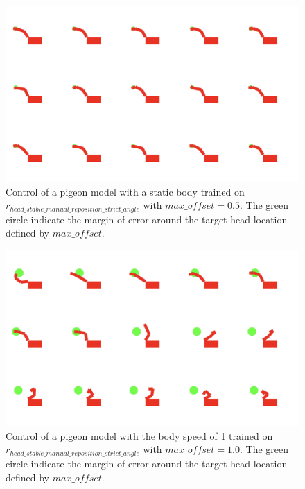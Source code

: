 
  \begin{figure}[H]
      \centering
      \includegraphics[width=1\textwidth]{figures/frames/frames_001.png}
      \caption{Control of a pigeon model with a static body trained on $r_{head\_stable\_manual\_reposition\_strict\_angle}$ with $max\_offset = 0.5$. The green circle indicate the margin of error around the target head location defined by $max\_offset$.}
      \label{fig:manual_trajectory_body_speed_0}
  \end{figure}

  \begin{figure}[H]
      \centering
      \includegraphics[width=1\textwidth]{figures/frames/frames_002.png}
      \caption{Control of a pigeon model with the body speed of 1 trained on $r_{head\_stable\_manual\_reposition\_strict\_angle}$ with $max\_offset = 1.0$. The green circle indicate the margin of error around the target head location defined by $max\_offset$.}
      \label{fig:manual_trajectory_strict_body_speed_1}
  \end{figure}

